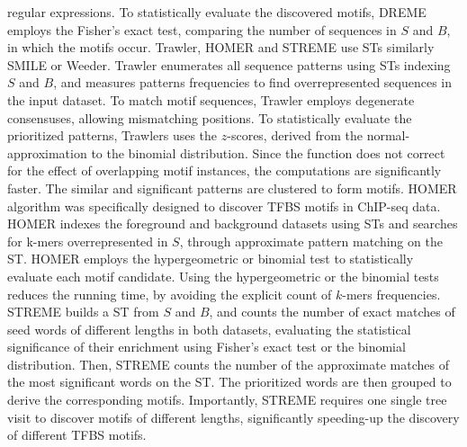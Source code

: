 \documentclass[a4paper, titlepage, 8pt, openright]{book}
\begin{document}
regular expressions. To statistically evaluate the discovered motifs, DREME employs the Fisher's exact test, comparing the number of sequences in $S$ and $B$, in which the motifs occur. Trawler, HOMER and STREME \citep{ettwiller2007trawler,heinz2010simple,bailey2021streme} use STs similarly SMILE or Weeder. Trawler enumerates all sequence patterns using STs indexing $S$ and $B$, and measures patterns frequencies to find overrepresented sequences in the input dataset. To match motif sequences, Trawler employs degenerate consensuses, allowing mismatching positions. To statistically evaluate the prioritized patterns, Trawlers uses the $z$-scores, derived from the normal-approximation to the binomial distribution. Since the function does not correct for the effect of overlapping motif instances, the computations are significantly faster. The similar and significant patterns are clustered to form motifs. HOMER algorithm was specifically designed to discover TFBS motifs in ChIP-seq data. HOMER indexes the foreground and background datasets using STs and searches for k-mers  overrepresented in $S$, through approximate pattern matching on the ST. HOMER employs the hypergeometric or binomial test to statistically evaluate each motif candidate. Using the hypergeometric or the binomial tests reduces the running time, by avoiding the explicit count of $k$-mers frequencies. STREME builds a ST from $S$ and $B$, and counts the number of exact matches of seed words of different lengths in both datasets, evaluating the statistical significance of their enrichment using Fisher's exact test or the binomial distribution. Then, STREME counts the number of the approximate matches of the most significant words on the ST. The prioritized words are then grouped to derive the corresponding motifs. Importantly, STREME requires one single tree visit to discover motifs of different lengths, significantly speeding-up the discovery of different TFBS motifs.
\end{document}
